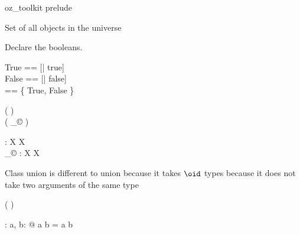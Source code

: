 \begin{zsection}
  \SECTION oz\_toolkit \parents prelude
\end{zsection}

Set of all objects in the universe

\begin{zed}
  [\oid]
\end{zed}

Declare the booleans.

\begin{zed}
  True == [| true]\\
  False == [| false]\\
  \bool == \{ True, False \}
\end{zed}

\begin{zed}
  \function ( \poly \varg )\\
  \function ( \varg _{\copyright} )
\end{zed}

\begin{gendef}[X]
  \poly \varg : X \fun X\\
  \varg _{\copyright} : X \fun X
\end{gendef}

Class union is different to union because it takes $\oid$ types
because it does not take two arguments of the same type

\begin{zed}
   \leftassoc ( \varg \classuni \varg )
\end{zed}

\begin{axdef}
  \varg \classuni \varg : \power \oid \cross \power \oid \fun \power \oid
\where
  \forall a, b: \power \oid @ a \classuni b = a \cup b
\end{axdef}
